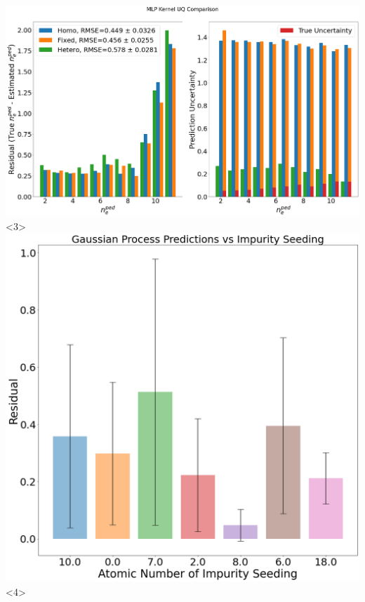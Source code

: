 \documentclass{beamer}
\begin{document}
\begin{frame}
\begin{columns}
\includegraphics[scale=0.135]{../src/MLP_UQ_compare}<3>
\includegraphics[scale=0.2]{../src/GP_preds_impurity}<4>
\end{columns}
\end{frame}
\end{document}
